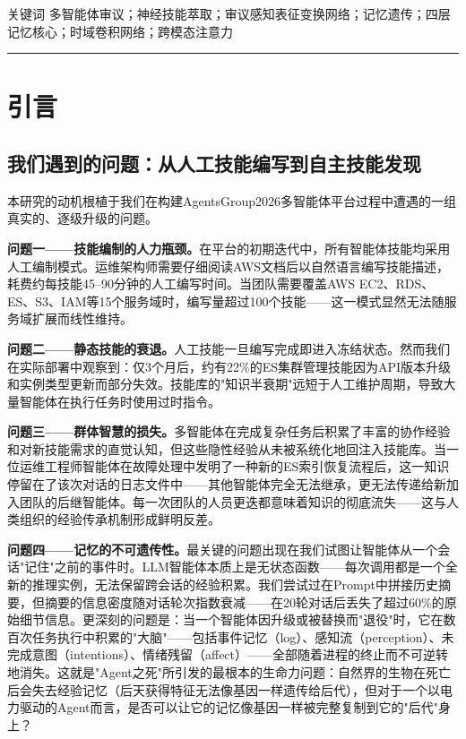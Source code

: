 \documentclass[twocolumn,10.5pt]{ctexart}
\begin{document}
\vspace{6pt}
{\heiti 关键词 \quad}{\kaishu 多智能体审议；神经技能萃取；审议感知表征变换网络；记忆遗传；四层记忆核心；时域卷积网络；跨模态注意力}

\vspace{12pt}
\hrule
\vspace{12pt}

\section{引言}

\subsection{我们遇到的问题：从人工技能编写到自主技能发现}

本研究的动机根植于我们在构建AgentsGroup2026多智能体平台过程中遭遇的一组真实的、逐级升级的问题。

\textbf{问题一——技能编制的人力瓶颈。}在平台的初期迭代中，所有智能体技能均采用人工编制模式。运维架构师需要仔细阅读AWS文档后以自然语言编写技能描述，耗费约每技能45--90分钟的人工编写时间。当团队需要覆盖AWS EC2、RDS、ES、S3、IAM等15个服务域时，编写量超过100个技能——这一模式显然无法随服务域扩展而线性维持。

\textbf{问题二——静态技能的衰退。}人工技能一旦编写完成即进入冻结状态。然而我们在实际部署中观察到：仅3个月后，约有22\%的ES集群管理技能因为API版本升级和实例类型更新而部分失效。技能库的"知识半衰期"远短于人工维护周期，导致大量智能体在执行任务时使用过时指令。

\textbf{问题三——群体智慧的损失。}多智能体在完成复杂任务后积累了丰富的协作经验和对新技能需求的直觉认知，但这些隐性经验从未被系统化地回注入技能库。当一位运维工程师智能体在故障处理中发明了一种新的ES索引恢复流程后，这一知识停留在了该次对话的日志文件中——其他智能体完全无法继承，更无法传递给新加入团队的后继智能体。每一次团队的人员更迭都意味着知识的彻底流失——这与人类组织的经验传承机制形成鲜明反差。

\textbf{问题四——记忆的不可遗传性。}最关键的问题出现在我们试图让智能体从一个会话"记住"之前的事件时。LLM智能体本质上是无状态函数——每次调用都是一个全新的推理实例，无法保留跨会话的经验积累。我们尝试过在Prompt中拼接历史摘要，但摘要的信息密度随对话轮次指数衰减——在20轮对话后丢失了超过60\%的原始细节信息。更深刻的问题是：当一个智能体因升级或被替换而"退役"时，它在数百次任务执行中积累的"大脑"——包括事件记忆（log）、感知流（perception）、未完成意图（intentions）、情绪残留（affect）——全部随着进程的终止而不可逆转地消失。这就是"Agent之死"所引发的最根本的生命力问题：自然界的生物在死亡后会失去经验记忆（后天获得特征无法像基因一样遗传给后代），但对于一个以电力驱动的Agent而言，是否可以让它的记忆像基因一样被完整复制到它的"后代"身上？
\end{document}
